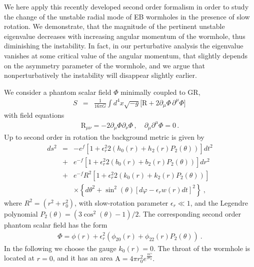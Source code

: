 \documentclass[twocolumn,showpacs,preprintnumbers,amsmath,amssymb,floatfix]{revtex4-1}
\begin{document}
We here apply this recently developed second order formalism \cite{Blazquez-Salcedo:2022eik} in order to study the change of the unstable radial mode of EB wormholes in the presence of slow rotation.
We demonstrate, that the magnitude of the pertinent unstable eigenvalue decreases with increasing angular momentum of the wormhole, thus diminishing the instability.
In fact, in our perturbative analysis the eigenvalue 
%
{vanishes}
at some critical value of the angular momentum, that slightly depends on the asymmetry parameter of the wormhole, {and we argue that nonperturbatively the instability will disappear slightly earlier}.


We consider a phantom scalar field $\Phi$ minimally coupled to GR,
\begin{eqnarray}
			S &=& \frac{1}{16 \pi G}\int d^4x \sqrt{-g} 
		\Big[\mathrm{R} + 2 \partial_\mu \Phi \, \partial^\mu \Phi 
		 \Big] \, 
   \label{eq:ellis} 
\end{eqnarray}
with field equations %
\begin{eqnarray}
    \mathrm{R}_{\mu\nu} = -2 \partial_{\mu}\Phi\partial_{\nu}\Phi \, , \quad 
    \partial_{\mu}\partial^{\mu}\Phi = 0 \, .
\end{eqnarray}
%
Up to second order in rotation the background metric is given by
\begin{eqnarray}
ds^2 &=& -e^{f}\left[1+\epsilon_r^2 2\left(h_0(r)+h_2(r)P_2(\theta)\right)\right]dt^2 
\nonumber 
\\ 
%
&+& e^{-f}\left[1+\epsilon_r^2 2\left(b_0(r)+b_2(r)P_2(\theta)\right)\right]dr^2 \nonumber \\ 
&+& 
%
{e^{-f}} R^2
\left[1+\epsilon_r^2 2\left(k_0(r)+k_2(r)P_2(\theta)\right)\right]
\nonumber 
\\ 
&& \times 
\left\{ d\theta^2+\sin^2{(\theta)}\left[d\varphi-\epsilon_rw(r)dt\right]^2 \right\} \ ,
\label{metric_1}
\end{eqnarray}
where $R^2=(r^2+r_0^2)$, with slow-rotation parameter $\epsilon_r \ll 1$, and the Legendre polynomial $P_2(\theta) = \left(3\cos^2{(\theta)}-1\right)/2$.
%
%
%
The corresponding second order phantom scalar field has the form
\begin{eqnarray}
\Phi = \phi(r) + \epsilon_r^2 \left(\phi_{20}(r)+\phi_{22}(r)P_2(\theta)\right) \ .
\label{scalar_1}
\end{eqnarray}
%
In the following we choose the gauge $k_0(r)=0$.
%
The throat of the wormhole is located at $r=0$, and it has an area {$\mathrm{A}=4\pi r_0^2 e^{\frac{\pi C}{2r_0}}$.}
%
%
\end{document}
